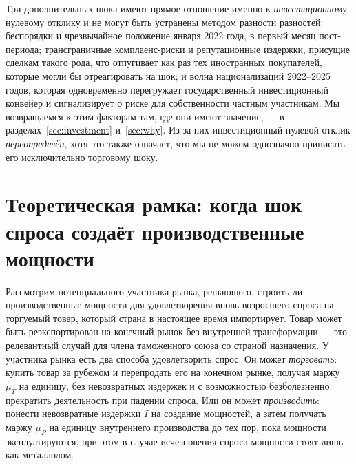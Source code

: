 \documentclass[12pt]{article}
\begin{document}
Три дополнительных шока имеют прямое отношение именно к \emph{инвестиционному} нулевому
отклику и не могут быть устранены методом разности разностей: беспорядки и чрезвычайное
положение января 2022 года, в первый месяц пост-периода; трансграничные комплаенс-риски и
репутационные издержки, присущие сделкам такого рода, что отпугивает как раз тех
иностранных покупателей, которые могли бы отреагировать на шок; и волна национализаций
2022--2025 годов, которая одновременно перегружает государственный инвестиционный конвейер
и сигнализирует о риске для собственности частным участникам. Мы возвращаемся к этим
факторам там, где они имеют значение, — в разделах~\ref{sec:investment}
и~\ref{sec:why}. Из-за них инвестиционный нулевой отклик \emph{переопределён}, хотя это
также означает, что мы не можем однозначно приписать его исключительно торговому шоку.

\section{Теоретическая рамка: когда шок спроса создаёт производственные мощности}\label{sec:framework}

Рассмотрим потенциального участника рынка, решающего, строить ли производственные мощности
для удовлетворения вновь возросшего спроса на торгуемый товар, который страна в настоящее
время импортирует. Товар может быть реэкспортирован на конечный рынок без внутренней
трансформации — это релевантный случай для члена таможенного союза со страной назначения.
У участника рынка есть два способа удовлетворить спрос. Он может \emph{торговать}: купить
товар за рубежом и перепродать его на конечном рынке, получая маржу $\mu_T$ на единицу, без
невозвратных издержек и с возможностью безболезненно прекратить деятельность при падении
спроса. Или он может \emph{производить}: понести невозвратные издержки $I$ на создание
мощностей, а затем получать маржу $\mu_P$ на единицу внутреннего производства до тех пор,
пока мощности эксплуатируются, при этом в случае исчезновения спроса мощности стоят лишь
как металлолом.
\end{document}
